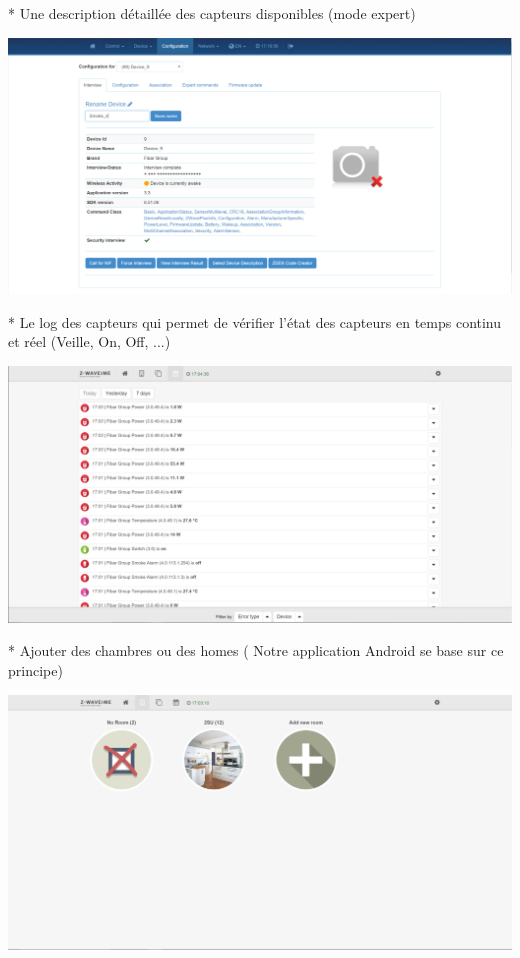 * Une description détaillée des capteurs disponibles (mode expert)

\includegraphics[scale=0.5]{./Images/png/description_zwaveme.png}\newline

* Le log des capteurs qui permet de vérifier l'état des capteurs en temps continu et réel (Veille, On, Off, ...)


\includegraphics[scale=0.5]{./Images/png/log_zwaveme.png}\newline

* Ajouter des chambres ou des homes ( Notre application Android se base sur ce principe)

\includegraphics[scale=0.5]{./Images/png/room_zwaveme.png}\newline

